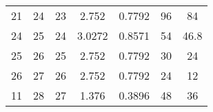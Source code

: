 \begin{table}[]
\begin{tabular}{@{}ccccccc@{}}
21                                                           & 24                                                              & 23                                                   & 2.752                                                                           & 0.7792                                                                        & 96                                                                              & 84                                                                                   \\
24                                                           & 25                                                              & 24                                                   & 3.0272                                                                          & 0.8571                                                                        & 54                                                                              & 46.8                                                                                 \\
25                                                           & 26                                                              & 25                                                   & 2.752                                                                           & 0.7792                                                                        & 30                                                                              & 24                                                                                   \\
26                                                           & 27                                                              & 26                                                   & 2.752                                                                           & 0.7792                                                                        & 24                                                                              & 12                                                                                   \\
11                                                           & 28                                                              & 27                                                   & 1.376                                                                           & 0.3896                                                                        & 48                                                                              & 36                                                                                   \\

\end{tabular}
\end{table}
